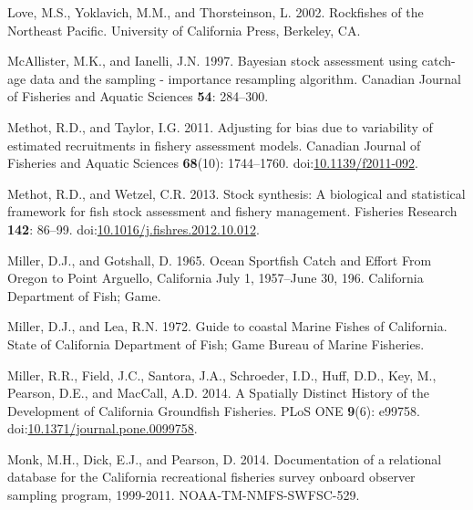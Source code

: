 \documentclass[11pt,
  english,
  letterpaper,
]{article}
\newlength{\cslhangindent}
\newenvironment{CSLReferences}[2] %
 {%
  \setlength{\parindent}{0pt}
  \ifodd #1 \everypar{\setlength{\hangindent}{\cslhangindent}}\ignorespaces\fi
  \ifnum #2 > 0
  \setlength{\parskip}{#2\baselineskip}
  \fi
 }%
 {}
\begin{document}
\begin{CSLReferences}{1}{0}
\leavevmode{}%
Love, M.S., Yoklavich, M.M., and Thorsteinson, L. 2002. Rockfishes of the {Northeast} {Pacific}. University of California Press, Berkeley, CA.

\leavevmode{}%
McAllister, M.K., and Ianelli, J.N. 1997. Bayesian stock assessment using catch-age data and the sampling - importance resampling algorithm. Canadian Journal of Fisheries and Aquatic Sciences \textbf{54}: 284--300.

\leavevmode{}%
Methot, R.D., and Taylor, I.G. 2011. Adjusting for bias due to variability of estimated recruitments in fishery assessment models. Canadian Journal of Fisheries and Aquatic Sciences \textbf{68}(10): 1744--1760. doi:\href{https://doi.org/10.1139/f2011-092}{10.1139/f2011-092}.

\leavevmode{}%
Methot, R.D., and Wetzel, C.R. 2013. Stock synthesis: A biological and statistical framework for fish stock assessment and fishery management. Fisheries Research \textbf{142}: 86--99. doi:\href{https://doi.org/10.1016/j.fishres.2012.10.012}{10.1016/j.fishres.2012.10.012}.

\leavevmode{}%
Miller, D.J., and Gotshall, D. 1965. Ocean {Sportfish} {Catch} and {Effort} {From} {Oregon} to {Point} {Arguello}, {California} {July} 1, 1957--{June} 30, 196. California Department of Fish; Game.

\leavevmode{}%
Miller, D.J., and Lea, R.N. 1972. Guide to coastal {Marine} {Fishes} of {California}. State of California Department of Fish; Game Bureau of Marine Fisheries.

\leavevmode{}%
Miller, R.R., Field, J.C., Santora, J.A., Schroeder, I.D., Huff, D.D., Key, M., Pearson, D.E., and MacCall, A.D. 2014. A {Spatially} {Distinct} {History} of the {Development} of {California} {Groundfish} {Fisheries}. PLoS ONE \textbf{9}(6): e99758. doi:\href{https://doi.org/10.1371/journal.pone.0099758}{10.1371/journal.pone.0099758}.

\leavevmode{}%
Monk, M.H., Dick, E.J., and Pearson, D. 2014. Documentation of a relational database for the {California} recreational fisheries survey onboard observer sampling program, 1999-2011. NOAA-TM-NMFS-SWFSC-529.


\end{CSLReferences}
\end{document}
